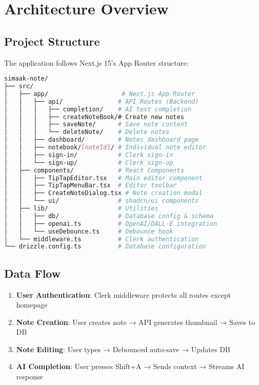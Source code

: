 \documentclass[11pt,a4paper]{article}
\begin{document}
\section{Architecture Overview}

\subsection{Project Structure}

The application follows Next.js 15's App Router structure:

\begin{lstlisting}[language=bash]
simaak-note/
├── src/
│   ├── app/                    # Next.js App Router
│   │   ├── api/               # API Routes (Backend)
│   │   │   ├── completion/    # AI text completion
│   │   │   ├── createNoteBook/# Create new notes
│   │   │   ├── saveNote/      # Save note content
│   │   │   └── deleteNote/    # Delete notes
│   │   ├── dashboard/         # Notes dashboard page
│   │   ├── notebook/[noteId]/ # Individual note editor
│   │   ├── sign-in/           # Clerk sign-in
│   │   └── sign-up/           # Clerk sign-up
│   ├── components/            # React Components
│   │   ├── TipTapEditor.tsx   # Main editor component
│   │   ├── TipTapMenuBar.tsx  # Editor toolbar
│   │   ├── CreateNoteDialog.tsx # Note creation modal
│   │   └── ui/                # shadcn/ui components
│   ├── lib/                   # Utilities
│   │   ├── db/                # Database config & schema
│   │   ├── openai.ts          # OpenAI/DALL-E integration
│   │   └── useDebounce.ts     # Debounce hook
│   └── middleware.ts          # Clerk authentication
└── drizzle.config.ts          # Database configuration
\end{lstlisting}

\subsection{Data Flow}

\begin{enumerate}
    \item \textbf{User Authentication}: Clerk middleware protects all routes except homepage
    \item \textbf{Note Creation}: User creates note → API generates thumbnail → Saves to DB
    \item \textbf{Note Editing}: User types → Debounced auto-save → Updates DB
    \item \textbf{AI Completion}: User presses Shift+A → Sends context → Streams AI response
\end{enumerate}
\end{document}
